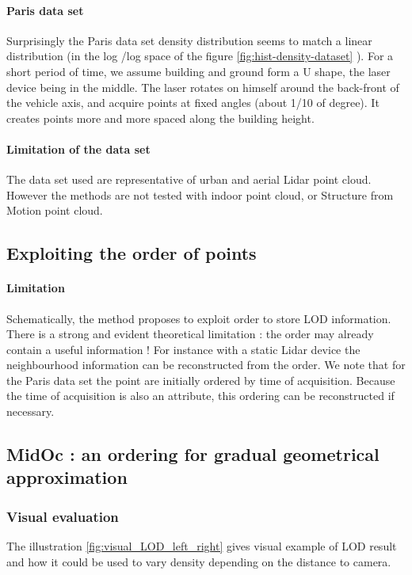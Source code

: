 		 \paragraph{Paris data set}
			 Surprisingly the Paris data set density distribution seems to match a linear distribution (in the log /log space of the figure \ref{fig:hist-density-dataset} ).
			 For a short period of time, we assume building and ground form a U shape, the laser device being in the middle. The laser rotates on himself around the back-front of the vehicle axis, and acquire points at fixed angles (about 1/10 of degree). It creates points more and more spaced along the building height.
			 
		 \paragraph{Limitation of the data set}
			 The data set used are representative of urban and aerial Lidar point cloud. However the methods are not tested with indoor point cloud, or Structure from Motion point cloud.
		 
	 \subsection{Exploiting the order of points}
		 \paragraph{Limitation}
			 Schematically, the method proposes to exploit order to store LOD information. There is a strong and evident theoretical limitation : the order may already contain a useful information !
			 For instance with a static Lidar device the neighbourhood information can be reconstructed from the order. We note that for the Paris data set the point are initially ordered by time of acquisition. Because the time of acquisition is also an attribute, this ordering can be reconstructed if necessary.
			 
	 \subsection{MidOc : an ordering for gradual geometrical approximation}
		 \subsubsection{Visual evaluation}
			 The illustration \ref{fig:visual_LOD_left_right} gives visual example of LOD result and how it could be used to vary density depending on the distance to camera.
			 

